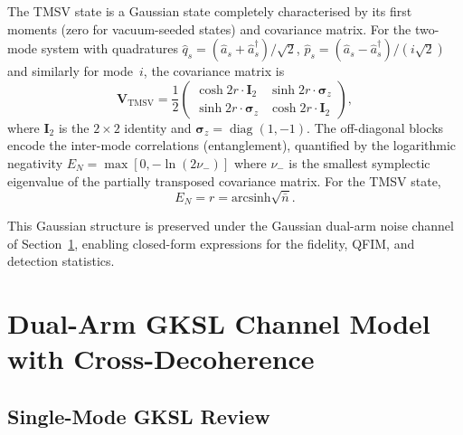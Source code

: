 \documentclass[journal]{IEEEtran}
\DeclareMathOperator{\diag}{diag}
\begin{document}
The TMSV state is a Gaussian state completely characterised by its first moments (zero for vacuum-seeded states) and covariance matrix. For the two-mode system with quadratures $\hat{q}_s = (\hat{a}_s + \hat{a}_s^\dagger)/\sqrt{2}$, $\hat{p}_s = (\hat{a}_s - \hat{a}_s^\dagger)/(i\sqrt{2})$ and similarly for mode~$i$, the covariance matrix is~\cite{weedbrook2012gaussian}
\begin{equation}\label{eq:tmsv_covariance}
\mathbf{V}_{\text{TMSV}} = \frac{1}{2}\begin{pmatrix}
\cosh 2r \cdot \mathbf{I}_2 & \sinh 2r \cdot \boldsymbol{\sigma}_z \\
\sinh 2r \cdot \boldsymbol{\sigma}_z & \cosh 2r \cdot \mathbf{I}_2
\end{pmatrix},
\end{equation}
where $\mathbf{I}_2$ is the $2\times 2$ identity and $\boldsymbol{\sigma}_z = \diag(1, -1)$. The off-diagonal blocks encode the inter-mode correlations (entanglement), quantified by the logarithmic negativity $E_N = \max[0, -\ln(2\nu_-)]$ where $\nu_-$ is the smallest symplectic eigenvalue of the partially transposed covariance matrix. For the TMSV state,
\begin{equation}\label{eq:log_negativity}
E_N = r = \text{arcsinh}\sqrt{\bar{n}}.
\end{equation}

This Gaussian structure is preserved under the Gaussian dual-arm noise channel of Section~\ref{sec:dual_gksl}, enabling closed-form expressions for the fidelity, QFIM, and detection statistics.


\section{Dual-Arm GKSL Channel Model with Cross-Decoherence}\label{sec:dual_gksl}

\subsection{Single-Mode GKSL Review}
\end{document}
